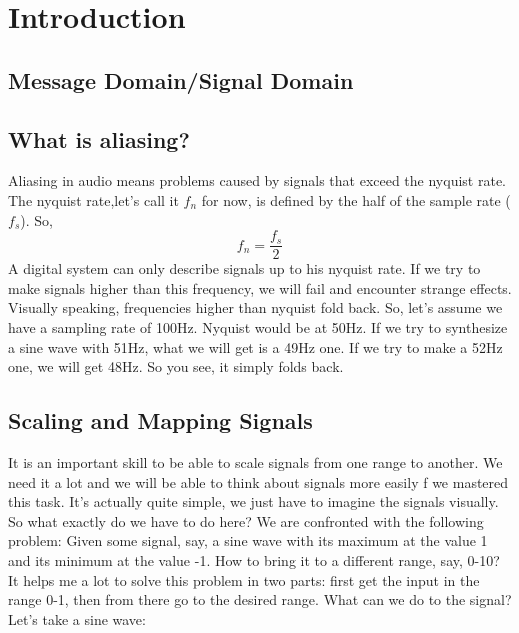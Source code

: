 \chapter{Introduction}
\label{introduction}

\section{Message Domain/Signal Domain}


\section{What is aliasing?}
Aliasing in audio means problems caused by signals that exceed the nyquist rate.\\
The nyquist rate,let's call it $f_n$ for now, is defined by the half of the sample rate ($f_s$). So, 
\begin{equation}
	f_n=\frac{f_s}{2}
\end{equation}
A digital system can only describe signals up to his nyquist rate. If we try to make signals higher than this frequency, we will fail and encounter strange effects.\\
Visually speaking, frequencies higher than nyquist fold back. So, let's assume we have a sampling rate of 100Hz. Nyquist would be at 50Hz. If we try to synthesize a sine wave with 51Hz, what we will get is a 49Hz one. If we try to make a 52Hz one, we will get 48Hz. So you see, it simply folds back.



\section{Scaling and Mapping Signals}
It is an important skill to be able to scale signals from one range to another. We need it a lot and we will be able to think about signals more easily f we mastered this task. It's actually quite simple, we just have to imagine the signals visually.\\
So what exactly do we have to do here? We are confronted with the following problem: Given some signal, say, a sine wave with its maximum at the value 1 and its minimum at the value -1. How to bring it to a different range, say, 0-10?\\
It helps me a lot to solve this problem in two parts: first get the input in the range 0-1, then from there go to the desired range. What can we do to the signal? Let's take a sine wave:

